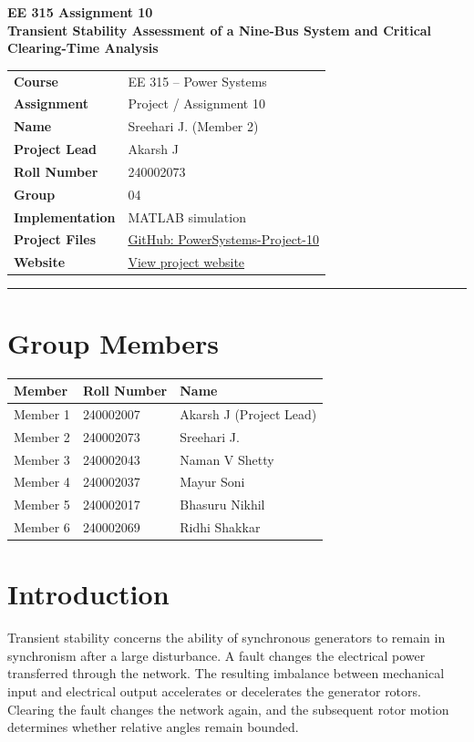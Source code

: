 \documentclass[11pt,a4paper]{article}
\begin{document}
\begin{center}\large\textbf{EE 315 Assignment 10}\\[5pt]\Large\textbf{Transient Stability Assessment of a Nine-Bus System and Critical Clearing-Time Analysis}\end{center}
\begin{tabular}{ll}
\textbf{Course}&EE 315 -- Power Systems\\
\textbf{Assignment}&Project / Assignment 10\\
\textbf{Name}&Sreehari J. (Member 2)\\
\textbf{Project Lead}&Akarsh J\\
\textbf{Roll Number}&240002073\\
\textbf{Group}&04\\
\textbf{Implementation}&MATLAB simulation\\
\textbf{Project Files}&\href{https://github.com/pacificblaster1708/PowerSystems-Project-10}{GitHub: PowerSystems-Project-10}\\
\textbf{Website}&\href{https://pacificblaster1708.github.io/PowerSystems-Project-10/}{View project website}
\end{tabular}
\vspace{10pt}\hrule
\section{Group Members}
\begin{center}\begin{tabular}{lll}\toprule Member&Roll Number&Name\\\midrule
Member 1&240002007&Akarsh J (Project Lead)\\
Member 2&240002073&Sreehari J.\\
Member 3&240002043&Naman V Shetty\\
Member 4&240002037&Mayur Soni\\
Member 5&240002017&Bhasuru Nikhil\\
Member 6&240002069&Ridhi Shakkar\\\bottomrule\end{tabular}\end{center}
\section{Introduction}
Transient stability concerns the ability of synchronous generators to remain in synchronism after a large disturbance. A fault changes the electrical power transferred through the network. The resulting imbalance between mechanical input and electrical output accelerates or decelerates the generator rotors. Clearing the fault changes the network again, and the subsequent rotor motion determines whether relative angles remain bounded.
\end{document}
